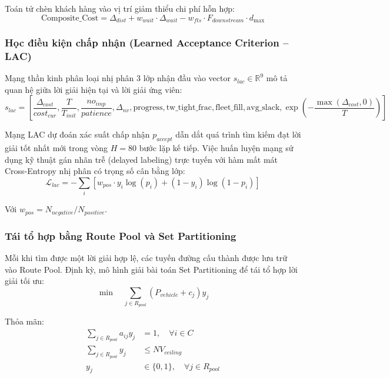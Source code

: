 \documentclass[13pt,a4paper]{extarticle}
\begin{document}
Toán tử chèn khách hàng vào vị trí giảm thiểu chi phí hỗn hợp:
\begin{equation}
\text{Composite\_Cost} = \Delta_{dist} + w_{wait} \cdot \Delta_{wait} - w_{fts} \cdot F_{downstream} \cdot d_{\max}
\end{equation}

\subsubsection{Học điều kiện chấp nhận (Learned Acceptance Criterion -- LAC)}

Mạng thần kinh phân loại nhị phân 3 lớp nhận đầu vào vector $s_{lac} \in \mathbb{R}^9$ mô tả quan hệ giữa lời giải hiện tại và lời giải ứng viên:
\begin{equation}
s_{lac} = \left[ \frac{\Delta_{cost}}{cost_{cur}}, \frac{T}{T_{init}}, \frac{no_{imp}}{patience}, \Delta_{nv}, \text{progress}, \text{tw\_tight\_frac}, \text{fleet\_fill}, \text{avg\_slack}, \exp\left(-\frac{\max(\Delta_{cost}, 0)}{T}\right) \right]
\end{equation}

Mạng LAC dự đoán xác suất chấp nhận $p_{accept}$ dẫn dắt quá trình tìm kiếm đạt lời giải tốt nhất mới trong vòng $H = 80$ bước lặp kế tiếp. Việc huấn luyện mạng sử dụng kỹ thuật gán nhãn trễ (delayed labeling) trực tuyến với hàm mất mát Cross-Entropy nhị phân có trọng số cân bằng lớp:
\begin{equation}
\mathcal{L}_{lac} = - \sum_{i} \left[ w_{pos} \cdot y_i \log(p_i) + (1 - y_i) \log(1 - p_i) \right]
\end{equation}

Với $w_{pos} = N_{negative} / N_{positive}$.

\subsubsection{Tái tổ hợp bằng Route Pool và Set Partitioning}

Mỗi khi tìm được một lời giải hợp lệ, các tuyến đường cấu thành được lưu trữ vào Route Pool. Định kỳ, mô hình giải bài toán Set Partitioning để tái tổ hợp lời giải tối ưu:
\begin{equation}
\min \quad \sum_{j \in R_{pool}} \left( P_{vehicle} + c_j \right) y_j
\end{equation}

Thỏa mãn:
\begin{align}
\sum_{j \in R_{pool}} a_{ij} y_j &= 1, \quad \forall i \in C \\
\sum_{j \in R_{pool}} y_j &\le NV_{ceiling} \\
y_j &\in \{0, 1\}, \quad \forall j \in R_{pool}
\end{align}
\end{document}
